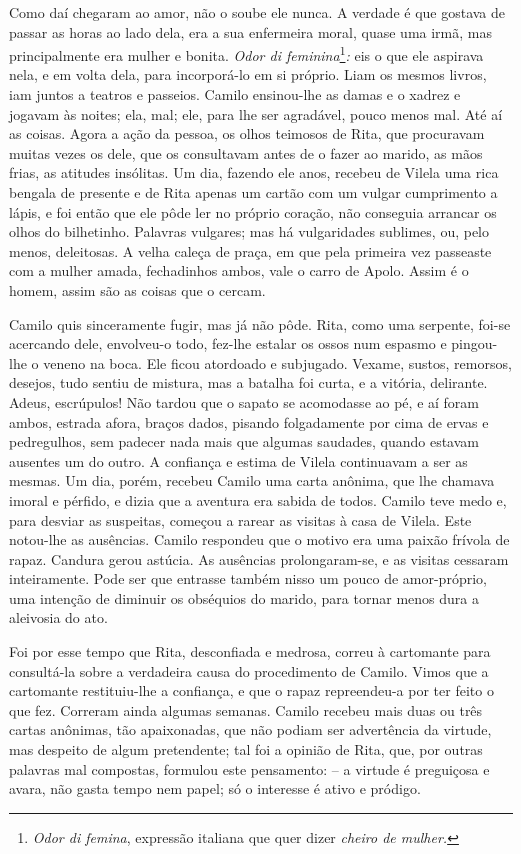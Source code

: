 Como daí chegaram ao amor, não o soube ele nunca. A verdade é que
gostava de passar as horas ao lado dela, era a sua enfermeira moral,
quase uma irmã, mas principalmente era mulher e bonita. \emph{Odor di
feminina}\footnote{\emph{Odor di femina}, expressão italiana que quer
  dizer \emph{cheiro de mulher. }}\emph{:} eis o que ele aspirava nela,
e em volta dela, para incorporá-lo em si próprio. Liam os mesmos livros,
iam juntos a teatros e passeios. Camilo ensinou-lhe as damas e o xadrez
e jogavam às noites; ela, mal; ele, para lhe ser agradável, pouco menos
mal. Até aí as coisas. Agora a ação da pessoa, os olhos teimosos de
Rita, que procuravam muitas vezes os dele, que os consultavam antes de o
fazer ao marido, as mãos frias, as atitudes insólitas. Um dia, fazendo
ele anos, recebeu de Vilela uma rica bengala de presente e de Rita
apenas um cartão com um vulgar cumprimento a lápis, e foi então que ele
pôde ler no próprio coração, não conseguia arrancar os olhos do
bilhetinho. Palavras vulgares; mas há vulgaridades sublimes, ou, pelo
menos, deleitosas. A velha caleça de praça, em que pela primeira vez
passeaste com a mulher amada, fechadinhos ambos, vale o carro de Apolo.
Assim é o homem, assim são as coisas que o cercam.

Camilo quis sinceramente fugir, mas já não pôde. Rita, como uma
serpente, foi-se acercando dele, envolveu-o todo, fez-lhe estalar os
ossos num espasmo e pingou-lhe o veneno na boca. Ele ficou atordoado e
subjugado. Vexame, sustos, remorsos, desejos, tudo sentiu de mistura,
mas a batalha foi curta, e a vitória, delirante. Adeus, escrúpulos! Não
tardou que o sapato se acomodasse ao pé, e aí foram ambos, estrada
afora, braços dados, pisando folgadamente por cima de ervas e
pedregulhos, sem padecer nada mais que algumas saudades, quando estavam
ausentes um do outro. A confiança e estima de Vilela continuavam a ser
as mesmas. Um dia, porém, recebeu Camilo uma carta anônima, que lhe
chamava imoral e pérfido, e dizia que a aventura era sabida de todos.
Camilo teve medo e, para desviar as suspeitas, começou a rarear as
visitas à casa de Vilela. Este notou-lhe as ausências. Camilo respondeu
que o motivo era uma paixão frívola de rapaz. Candura gerou astúcia. As
ausências prolongaram-se, e as visitas cessaram inteiramente. Pode ser
que entrasse também nisso um pouco de amor-próprio, uma intenção de
diminuir os obséquios do marido, para tornar menos dura a aleivosia do
ato.

Foi por esse tempo que Rita, desconfiada e medrosa, correu à cartomante
para consultá-la sobre a verdadeira causa do procedimento de Camilo.
Vimos que a cartomante restituiu-lhe a confiança, e que o rapaz
repreendeu-a por ter feito o que fez. Correram ainda algumas semanas.
Camilo recebeu mais duas ou três cartas anônimas, tão apaixonadas, que
não podiam ser advertência da virtude, mas despeito de algum
pretendente; tal foi a opinião de Rita, que, por outras palavras mal
compostas, formulou este pensamento: -- a virtude é preguiçosa e avara,
não gasta tempo nem papel; só o interesse é ativo e pródigo.

